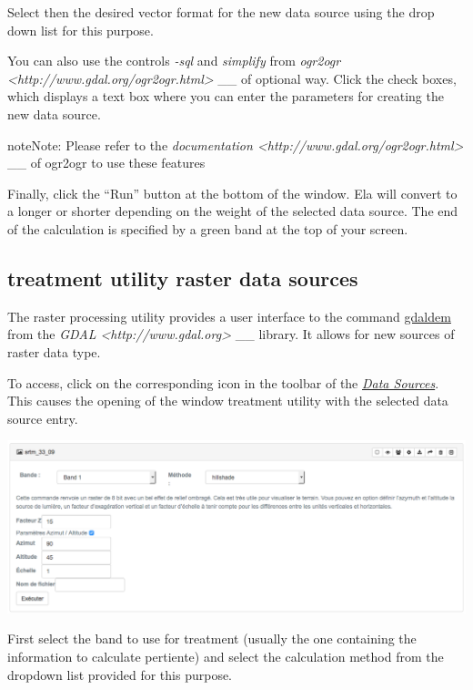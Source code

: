 \documentclass[letterpaper,10pt,english]{sphinxmanual}
\begin{document}
Select then the desired vector format for the new data source using the drop down list for this purpose.

You can also use the controls \emph{-sql} and \emph{simplify} from \emph{ogr2ogr \textless{}http://www.gdal.org/ogr2ogr.html\textgreater{}} \_\_ of optional way. Click the check boxes, which displays a text box where you can enter the parameters for creating the new data source.

\begin{notice}{note}{Note:}
Please refer to the \emph{documentation \textless{}http://www.gdal.org/ogr2ogr.html\textgreater{}} \_\_ of ogr2ogr to use these features
\end{notice}

Finally, click the ``Run'' button at the bottom of the window. Ela will convert to a longer or shorter depending on the weight of the selected data source. The end of the calculation is specified by a green band at the top of your screen.


\subsection{treatment utility raster data sources}
\label{data/processing:utilitaire-de-traitements-des-sources-de-donnees-matricielles}
The raster processing utility provides a user interface to the command \href{http://www.gdal.org/gdaldem.html}{gdaldem} from  the \emph{GDAL \textless{}http://www.gdal.org\textgreater{}} \_\_ library. It allows for new sources of raster data type.

To access, click on the corresponding icon in the toolbar of the {\hyperref[data/datasources::doc]{\emph{\emph{Data Sources}}}}. This causes the opening of the window treatment utility with the selected data source entry.

\includegraphics[width=1.000\linewidth]{process-raster-window.png}

First select the band to use for treatment (usually the one containing the information to calculate pertiente) and select the calculation method from the dropdown list provided for this purpose.
\end{document}
